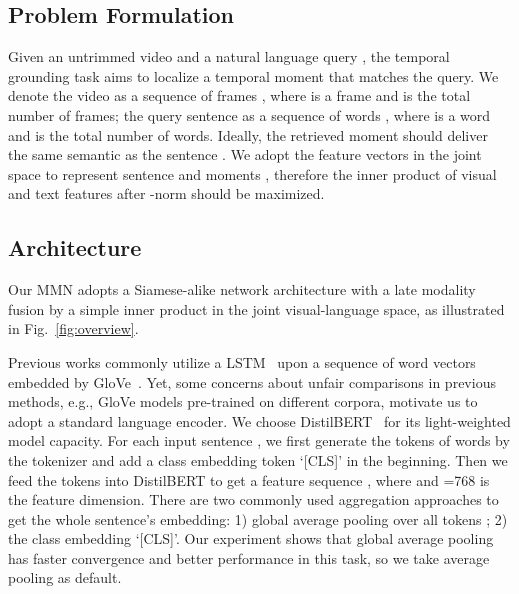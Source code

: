\documentclass[letterpaper]{article} \usepackage{aaai22}  \usepackage{times}  \usepackage{helvet}  \usepackage{courier}  \usepackage[hyphens]{url}  \usepackage{graphicx} \urlstyle{rm} \def\UrlFont{\rm}  \usepackage{natbib}  \usepackage{caption} \DeclareCaptionStyle{ruled}{labelfont=normalfont,labelsep=colon,strut=off} \frenchspacing  \setlength{\pdfpagewidth}{8.5in}  \setlength{\pdfpageheight}{11in}  \usepackage{algorithm}
\begin{document}
\subsection{Problem Formulation}
\label{sec:task}
Given an untrimmed video  and a natural language query , the temporal grounding task aims to localize a temporal moment  that matches the query. We denote the video as a sequence of frames , where  is a frame and  is the total number of frames; the query sentence as a sequence of words , where  is a word and  is the total number of words. Ideally, the retrieved moment  should deliver the same semantic as the sentence . We adopt the feature vectors in the joint space to represent sentence  and moments , therefore the inner product of visual and text features after -norm should be maximized.

\subsection{Architecture}
\label{sec:arch}
Our MMN adopts a Siamese-alike network architecture with a late modality fusion by a simple inner product in the joint visual-language space, as illustrated in Fig.~\ref{fig:overview}.

 Previous works commonly utilize a LSTM~\cite{DBLP:journals/neco/HochreiterS97} upon a sequence of word vectors embedded by GloVe~\cite{DBLP:conf/emnlp/PenningtonSM14}. Yet, some concerns about unfair comparisons in previous methods, e.g., GloVe models pre-trained on different corpora, motivate us to adopt a standard language encoder. We choose DistilBERT~\cite{DBLP:journals/corr/abs-1910-01108} for its light-weighted model capacity. For each input sentence , we first generate the tokens of words by the tokenizer and add a class embedding token `[CLS]' in the beginning. Then we feed the tokens into DistilBERT to get a feature sequence , where  and =768 is the feature dimension. There are two commonly used aggregation approaches to get the whole sentence's embedding: 1) global average pooling over all tokens
; 2) the class embedding `[CLS]'. Our experiment shows that global average pooling has faster convergence and better performance in this task, so we take average pooling as default. 
\end{document}
